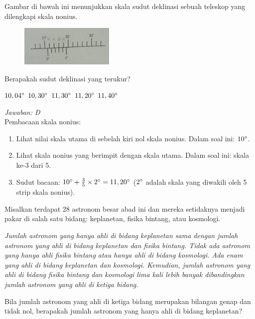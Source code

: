 \documentclass[11pt,fleqn]{exam}
\begin{document}
\begin{questions}
\question Gambar di bawah ini menunjukkan skala sudut deklinasi sebuah teleskop yang dilengkapi skala nonius. 
\begin{figure}[H]
\centering
\includegraphics[width=0.4\textwidth]{gambar/nonius.png}
\end{figure}
Berapakah sudut deklinasi yang terukur?
\begin{choices}
\choice $10,04\degree$
\choice $10,30\degree$
\choice $11,30\degree$
\choice $11,20\degree$
\choice $11,40\degree$
\end{choices}

\textit{Jawaban: D}\\
Pembacaan skala nonius:
\begin{enumerate}
\item Lihat nilai skala utama di sebelah kiri nol skala nonius. Dalam soal ini: $10\degree$.
\item Lihat skala nonius yang berimpit dengan skala utama. Dalam soal ini: skala ke-3 dari 5.
\item Sudut bacaan: $10\degree+\frac{3}{5}\times 2\degree=11,20\degree$ ($2\degree$ adalah skala yang diwakili oleh 5 strip skala nonius).\\
\end{enumerate}


\question Misalkan terdapat 28 astronom besar abad ini dan mereka setidaknya menjadi pakar di salah satu bidang: keplanetan, fisika bintang, atau kosmologi.

\noindent \textit{Jumlah astronom yang hanya ahli di bidang keplanetan sama dengan jumlah astronom yang ahli di bidang keplanetan dan fisika bintang. Tidak ada astronom yang hanya ahli fisika bintang atau hanya ahli di bidang kosmologi. Ada enam yang ahli di bidang keplanetan dan kosmologi. Kemudian, jumlah astronom yang ahli di bidang fisika bintang dan kosmologi lima kali lebih banyak dibandingkan jumlah astronom yang ahli di ketiga bidang.}

\noindent Bila jumlah astronom yang ahli di ketiga bidang merupakan bilangan genap dan tidak nol, berapakah jumlah astronom yang hanya ahli di bidang keplanetan?
\begin{choices}
\end{choices}


\end{questions}
\end{document}
